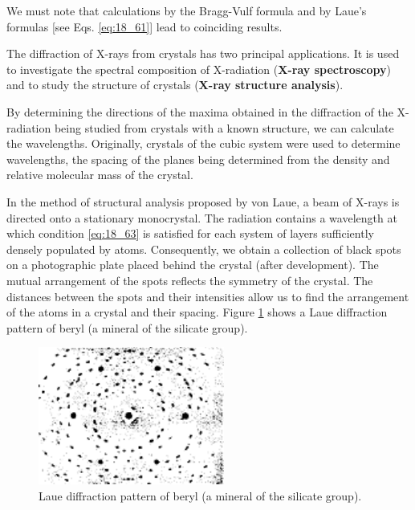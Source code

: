 We must note that calculations by the Bragg-Vulf formula and by Laue's formulas [see Eqs. \eqref{eq:18_61}] lead to coinciding results.

The diffraction of X-rays from crystals has two principal applications.
It is used to investigate the spectral composition of X-radiation (\textbf{X-ray spectroscopy}) and to study the structure of crystals (\textbf{X-ray structure analysis}).

By determining the directions of the maxima obtained in the diffraction of the X-radiation being studied from crystals with a known structure, we can calculate the wavelengths.
Originally, crystals of the cubic system were used to determine wavelengths, the spacing of the
planes being determined from the density and relative molecular mass of the crystal.

In the method of structural analysis proposed by von Laue, a beam of X-rays is directed onto
a stationary monocrystal.
The radiation contains a wavelength at which condition \eqref{eq:18_63} is satisfied for each system of layers sufficiently densely populated by atoms.
Consequently, we obtain a collection of black spots on a photographic plate placed behind the crystal (after development).
The mutual arrangement of the spots reflects the symmetry of the crystal.
The distances between the spots and their intensities allow us to find the arrangement of the atoms in a crystal and their spacing.
Figure \ref{fig:18_44} shows a Laue diffraction pattern of beryl (a mineral of the silicate group).

\begin{figure}[t]
	\begin{center}
		\includegraphics[scale=1.0]{figures/ch_18/fig_18_44.pdf}
        \caption[]{Laue diffraction pattern of beryl (a mineral of the silicate group).}
		\label{fig:18_44}
	\end{center}
	\vspace{-0.8cm}
\end{figure}

